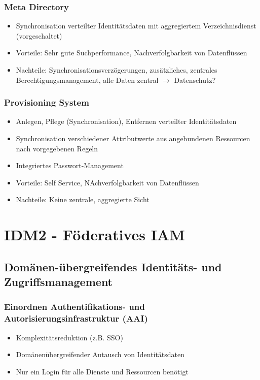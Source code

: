 \subsubsection{Meta Directory}
\begin{itemize}
	\item Synchronisation verteilter Identitätsdaten mit aggregiertem Verzeichnisdienst (vorgeschaltet)
	\item Vorteile: Sehr gute Suchperformance, Nachverfolgbarkeit von Datenflüssen
	\item Nachteile: Synchronisationsverzögerungen, zusätzliches, zentrales Berechtigungsmanagement, alle Daten zentral $\rightarrow$ Datenschutz?
\end{itemize}

\subsubsection{Provisioning System}
\begin{itemize}
	\item Anlegen, Pflege (Synchronisation), Entfernen verteilter Identitätsdaten
	\item Synchronisation verschiedener Attributwerte aus angebundenen Ressourcen nach vorgegebenen Regeln
	\item Integriertes Passwort-Management
	\item Vorteile: Self Service, NAchverfolgbarkeit von Datenflüssen
	\item Nachteile: Keine zentrale, aggregierte Sicht
\end{itemize}



\section{IDM2 - Föderatives IAM}

\subsection{Domänen-übergreifendes Identitäts- und Zugriffsmanagement}

\subsubsection{Einordnen Authentifikations- und Autorisierungsinfrastruktur (AAI)}
\begin{itemize}
	\item Komplexitätsreduktion (z.B. SSO)
	\item Domänenübergreifender Autausch von Identitätsdaten
	\item Nur ein Login für alle Dienste und Ressourcen benötigt
\end{itemize}

